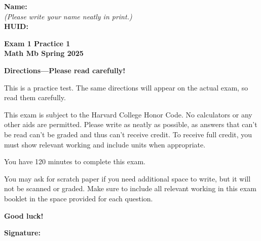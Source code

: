 \documentclass{article}
\begin{document}
{\large \mbox{} \hfill \bf Name:\underline{\hspace{3in}}}\\[2pt]
{\mbox{} \hfill \it (Please write your name neatly in print.)}\\[12pt]
{\large \mbox{} \hfill \bf HUID:\underline{\hspace{3in}}}
 
\medskip
 
\noindent
{\large\bf
Exam 1 Practice 1\\
Math Mb Spring 2025}
\noindent


{\Large
\begin{center}\textbf{Directions---Please read carefully!} \end{center}}

This is a practice test. The same directions will appear on the actual exam, so read them carefully.

\hrulefill 


This exam is subject to the Harvard College Honor Code. No calculators or any other aids are permitted.  Please write as neatly as possible, as answers that can't be read can't be graded and thus can't receive credit. To receive full credit, you must show relevant working
and include units when appropriate. 

You have 120 minutes to complete this exam. 

You may ask for scratch paper if you need additional space to write, but it will not be scanned or graded. Make sure to include all relevant working in this exam booklet in the space provided for each question.

\begin{center}\textbf{Good luck!}\end{center}


\vfill

\vspace{0.3in}

{\large \mbox{} \hfill \bf Signature:\underline{\hspace{3in}}}
\thispagestyle{empty}

\newpage
\end{document}
